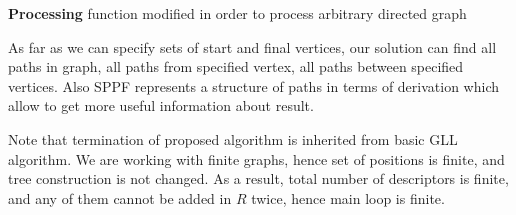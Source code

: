 \begin{algorithm}[h]
\begin{algorithmic}[1]
\caption{\textbf{Processing} function modified in order to process arbitrary directed graph}
\label{modifAlgo}
       \Else 
       \EndIf
       \EndIf
       \EndFor
  \EndCase
       \EndFor
  \EndCase
  \EndCase
  \Case{$\_$}
  \EndCase
  \EndSwitch
\EndFunction

\end{algorithmic}
\end{algorithm}

As far as we can specify sets of start and final vertices, our solution can find all paths in graph, all paths from specified vertex, all paths between specified vertices. 
Also SPPF represents a structure of paths in terms of derivation which allow to get more useful information about result. 

Note that termination of proposed algorithm is inherited from basic GLL algorithm.
We are working with finite graphs, hence set of positions is finite, and tree construction is not changed. 
As a result, total number of descriptors is finite, and any of them cannot be added in $R$ twice, hence main loop is finite.